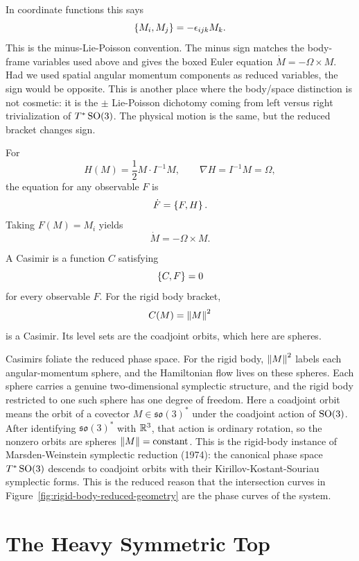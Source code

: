 In coordinate functions this says
\[
  \left\{M_i,M_j\right\}=-\epsilon_{ijk}M_k.
\]
This is the minus-Lie-Poisson convention. The minus sign matches the
body-frame variables used above and gives the boxed Euler equation
\(\dot M=-\Omega\times M\). Had we used spatial angular momentum components as
reduced variables, the sign would be opposite. This is another place where the
body/space distinction is not cosmetic: it is the \(\pm\) Lie-Poisson
dichotomy coming from left versus right trivialization of \(T^*\operatorname{SO}(3)\). The
physical motion is the same, but the reduced bracket changes sign.

For
\[
  H(M)=\frac12M\cdot I^{-1}M,
  \qquad
  \nabla H=I^{-1}M=\Omega,
\]
the equation for any observable \(F\) is
\[
  \dot F=\left\{F,H\right\}.
\]
Taking \(F(M)=M_i\) yields
\[
  \dot M=-\Omega\times M.
\]

\begin{definition}[Casimir]
A Casimir is a function \(C\) satisfying
\[
  \left\{C,F\right\}=0
\]
for every observable \(F\). For the rigid body bracket,
\[
  C(M)=\left\lVert M\right\rVert^2
\]
is a Casimir. Its level sets are the coadjoint orbits, which here are spheres.
\end{definition}

Casimirs foliate the reduced phase space. For the rigid body,
\(\left\lVert M\right\rVert^2\) labels each angular-momentum sphere, and the Hamiltonian flow
lives on these spheres. Each sphere carries a genuine two-dimensional
symplectic structure, and the rigid body restricted to one such sphere has one
degree of freedom.
Here a coadjoint orbit means the orbit of a covector
\(M\in\mathfrak{so}(3)^*\) under the coadjoint action of \(\operatorname{SO}(3)\). After
identifying \(\mathfrak{so}(3)^*\) with \(\mathbb{R}^3\), that action is ordinary
rotation, so the nonzero orbits are spheres \(\left\lVert M\right\rVert=\mathrm{constant}\).
This is the rigid-body instance of Marsden-Weinstein symplectic reduction
(1974): the canonical phase space \(T^*\operatorname{SO}(3)\) descends to coadjoint orbits
with their Kirillov-Kostant-Souriau symplectic forms.
This is the reduced reason that the intersection curves in
Figure~\ref{fig:rigid-body-reduced-geometry} are the phase curves of the
system.

\section{The Heavy Symmetric Top}
\label{sec:heavy-symmetric-top}


